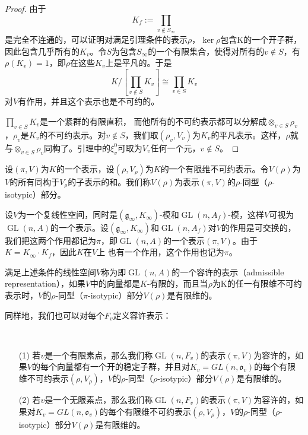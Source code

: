 \begin{proof}
由于
$$K_f := \prod\limits_{v \not \in S_\infty}$$
是完全不连通的，可以证明对满足引理条件的表示$\rho$，$\ker \rho$包含K的一个开子群，因此包含几乎所有的$K_v$。令$S$为包含$S_\infty$的一个有限集合，使得对所有的$v \not \in S$，有$\rho(K_v)=1$，即$\rho$在这些$K_v$上是平凡的。于是
$$K / [ \prod\limits_{v \not\in S} K_v ] \cong \prod\limits_{v \in S} K_v $$
对$V$有作用，并且这个表示也是不可约的。

$\prod\limits_{v \in S} K_v$是一个紧群的有限直积， 而他所有的不可约表示都可以分解成$\otimes_{v\in S}\rho_v$，$\rho_v$是$K_v$的不可约表示。对$v\not\in S$，我们取$(\rho_v, V_v)$为$K_v$的平凡表示。这样，$\rho$就与$\otimes_{v\in S}\rho_v$同构了。引理中的$\xi_v^0$可取为$V_v$任何一个元，$v \not\in S$。
\end{proof}

\begin{definition}
设$(\pi, V)$为$K$的一个表示，设$(\rho, V_\rho)$为$K$的一个有限维不可约表示。令$V(\rho)$为$V$的所有同构于$V_\rho$的子表示的和。我们称$V(\rho)$为表示$(\pi, V)$的$\rho$-同型（$\rho$-
isotypic）部分。
\end{definition}

设$V$为一个复线性空间，同时是$(\mathfrak{g}_\infty, K_\infty)$-模和$\operatorname{GL}(n,A_f)$-模，这样$V$可视为$\operatorname{GL}(n,A)$的一个表示。设$(\mathfrak{g}_\infty, K_\infty)$和$\operatorname{GL}(n,A_f)$对$V$的作用是可交换的，我们把这两个作用都记为$\pi$，即$\operatorname{GL}(n,A)$的一个表示$(\pi, V)$。由于$K = K_\infty\cdot K_f$，因此$K$在$V$上
也有一个作用，这个作用也记为$\pi$。

\begin{definition}
满足上述条件的线性空间$V$称为即$\operatorname{GL}(n,A)$的一个容许的表示（admissible representation），如果$V$中的向量都是$K$-有限的，而且当$\rho$为K的任一有限维不可约表示时，$V$的$\rho$-同型（$\pi$-isotypic）部分$V(\rho)$是有限维的。
\end{definition}

同样地，我们也可以对每个$F_v$定义容许表示：

\begin{definition}\
\begin{itemize}
\item[(1)] 若$v$是一个有限素点，那么我们称$\operatorname{GL}(n,F_v)$的表示$(\pi, V)$为容许的，如果$V$的每个向量都有一个开的稳定子群，并且对$K_v = GL(n, \mathfrak{o}_v)$的每个有限维不可约表示$(\rho, V_\rho)$，$V$的$\rho$-同型（$\rho$-isotypic）部分$V(\rho)$是有限维的。
\item[(2)] 若$v$是一个无限素点，那么我们称$\operatorname{GL}(n,F_v)$的表示$(\pi, V)$为容许的，如果对$K_v = GL(n, \mathfrak{o}_v)$的每个有限维不可约表示$(\rho, V_\rho)$，$V$的$\rho$-同型（$\rho$-isotypic）部分$V(\rho)$是有限维的。
\end{itemize}
\end{definition}

